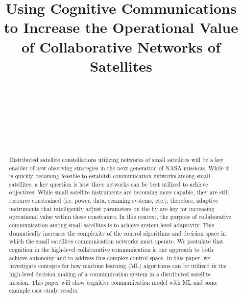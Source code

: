 \documentclass[conference]{IEEEtran}
\title{Using Cognitive Communications to Increase the Operational Value of
  Collaborative Networks of Satellites}
\author{
  \IEEEauthorblockN{Ryan B. Linnabary}
  \IEEEauthorblockA{\thisplace linnabary.24@osu.edu}
  \and
  \IEEEauthorblockN{Andrew J. O'Brien}
  \IEEEauthorblockA{\thisplace obrien.200@osu.edu}
  \and
  \IEEEauthorblockN{Graeme E. Smith}
  \IEEEauthorblockA{\thisplace smith.8347@osu.edu}
  \and {~} \and {~~~~~~~~~~~~~~~} \and
  \IEEEauthorblockN{Christopher Ball}
  \IEEEauthorblockA{\thisplace ball.51@osu.edu}
  \and {~~~~~~~~~~~~~~~} \and
  \IEEEauthorblockN{Joel T. Johnson}
  \IEEEauthorblockA{\thisplace johnson.1374@osu.edu}
  \and {~~~~~~~~~~~~~~~}
}
\begin{document}
\maketitle



\begin{abstract}
Distributed satellite constellations utilizing networks of small satellites will be a key enabler of new observing strategies in the next generation of NASA missions.  While it is quickly becoming feasible to establish communication networks among small satellites, a key question is how these networks can be best utilized to achieve objectives.  While small satellite instruments are becoming more capable, they are still resource constrained (i.e. power, data, scanning systems, etc.); therefore, adaptive instruments that intelligently adjust parameters on the fly are key for increasing operational value within these constraints.  In this context, the purpose of collaborative communication among small satellites is to achieve system-level adaptivity.  This dramatically increases the complexity of the control algorithms and decision space in which the small satellites communication networks must operate.  We postulate that cognition in the high-level collaborative communication is one approach to both achieve autonomy and to address this complex control space.  In this paper, we investigate concepts for how machine learning (ML) algorithms can be utilized in the high-level decision making of a communication system in a distributed satellite mission.  This paper will show cognitive communication model with ML and some example case study results.
\end{abstract}
\end{document}
